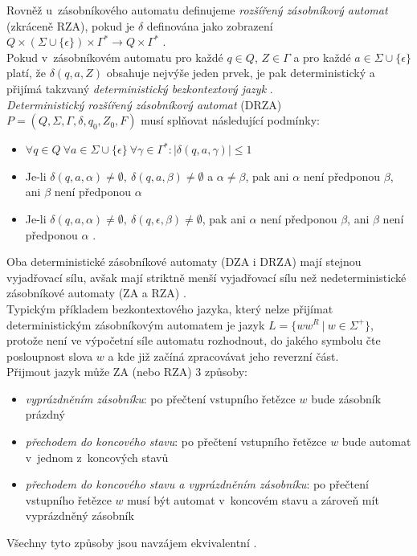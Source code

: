 Rovněž u~zásobníkového automatu definujeme \textit{rozšířený zásobníkový automat} (zkráceně RZA), pokud je $\delta$ definována jako zobrazení 
$Q \times (\Sigma \cup \{\epsilon\}) \times \Gamma^* \rightarrow Q \times \Gamma^*$ 
\cite[str. 83]{TIN2013}. \\

Pokud v~zásobníkovém automatu pro každé $q \in Q$, $Z \in \Gamma$ a pro každé $a \in \Sigma \cup \{\epsilon\}$ platí, že $\delta(q, a, Z)$ obsahuje 
nejvýše jeden prvek, je pak deterministický a přijímá takzvaný \textit{deterministický bezkontextový jazyk} \cite[str. 93]{TIN2013}. \\

\textit{Deterministický rozšířený zásobníkový automat} (DRZA) $P = (Q, \Sigma, \Gamma, \delta, q_0, Z_0, F)$ musí splňovat následující podmínky: \\
\begin{itemize}
\item $\forall q \in Q \ \forall a \in \Sigma \cup \{\epsilon\} \ \forall \gamma \in \Gamma^*: |\delta(q,a,\gamma)| \leq 1$
\item Je-li $\delta(q, a, \alpha) \neq \emptyset, \ \delta(q, a, \beta) \neq \emptyset$ a $\alpha \neq \beta$, pak ani $\alpha$ není předponou $\beta$, 
ani $\beta$ není předponou $\alpha$
\item Je-li $\delta(q, a, \alpha) \neq \emptyset, \ \delta(q, \epsilon, \beta) \neq \emptyset$, pak ani $\alpha$ není předponou $\beta$, 
ani $\beta$ není předponou $\alpha$ \cite[str. 93]{TIN2013}.
\end{itemize}
\vspace*{\baselineskip} 

Oba deterministické zásobníkové automaty (DZA i DRZA) mají stejnou vyjadřovací sílu, avšak mají striktně menší vyjadřovací sílu než nedeterministické 
zásobníkové automaty (ZA a RZA) \cite[str. 93]{TIN2013}. \\

\Bat{} Typickým příkladem bezkontextového jazyka, který nelze přijímat deterministickým zásobníkovým automatem je jazyk $L = \{ww^R \ | \ w \in \Sigma^+\}$,
protože není ve výpočetní síle automatu rozhodnout, do jakého symbolu čte posloupnost slova $w$ a kde již začíná zpracovávat jeho reverzní část. \\

Přijmout jazyk může ZA (nebo RZA) 3 způsoby:
\begin{itemize}
\item \textit{vyprázdněním zásobníku}: po přečtení vstupního řetězce $w$ bude zásobník prázdný
\item \textit{přechodem do koncového stavu}: po přečtení vstupního řetězce $w$ bude automat v~jednom z~koncových stavů
\item \textit{přechodem do koncového stavu a vyprázdněním zásobníku}: po přečtení vstupního řetězce $w$ musí být automat v~koncovém stavu 
a zároveň mít vyprázdněný zásobník
\end{itemize}
Všechny tyto způsoby jsou navzájem ekvivalentní \cite[str. 119]{Meduna2014}. \\

